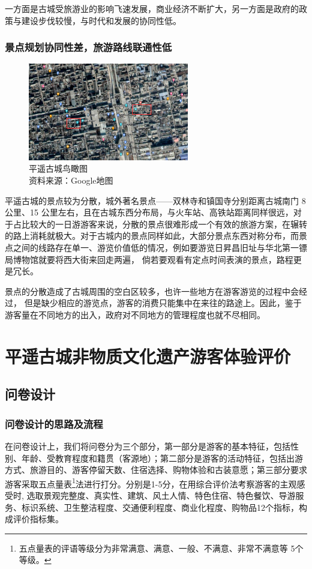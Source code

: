 \documentclass[UTF8]{ctexart}
\begin{document}
        一方面是古城受旅游业的影响飞速发展，商业经济不断扩大，另一方面是政府的政策与建设步伐较慢，与时代和发展的协同性低。
        \subsubsection{景点规划协同性差，旅游路线联通性低}
        \begin{figure}[H]
        \centering
        \includegraphics[width=7cm]{地图.png}
        \caption[plain]{平遥古城鸟瞰图\\资料来源：Google地图}

        \end{figure}
        平遥古城的景点较为分散，城外著名景点——双林寺和镇国寺分别距离古城南门 8 公里、15 公里左右，且在古城东西分布局，与火车站、高铁站距离同样很远，对于占比较大的一日游游客来说，分散的景点很难形成一个有效的旅游方案，在辗转的路上消耗就极大。对于古城内的景点同样如此，大部分景点东西对称分布，而景点之间的线路存在单一、游览价值低的情况，例如要游览日昇昌旧址与华北第一镖局博物馆就要将西大街来回走两遍， 倘若要观看有定点时间表演的景点，路程更是冗长。
        
        景点的分散造成了古城周围的空白区较多，也许一些地方在游客游览的过程中会经过， 但是缺少相应的游览点，游客的消费只能集中在来往的路途上。因此，鉴于游客量在不同地方的出入，政府对不同地方的管理程度也就不尽相同。
        
\section{平遥古城非物质文化遗产游客体验评价}
    \subsection{问卷设计}
        \subsubsection{问卷设计的思路及流程}
        在问卷设计上，我们将问卷分为三个部分，第一部分是游客的基本特征，包括性别、年龄、受教育程度和籍贯（客源地）；第二部分是游客的活动特征，包括出游方式、旅游目的、游客停留天数、住宿选择、购物体验和古装意愿；第三部分要求游客采取五点量表\footnote{五点量表的评语等级分为非常满意、满意、一般、不满意、非常不满意等 5个等级。}法进行打分。分别是1-5分，在用综合评价法考察游客的主观感受时, 选取景观完整度、真实性、建筑、风土人情、特色住宿、特色餐饮、导游服务、标识系统、卫生整洁程度、交通便利程度、商业化程度、购物品12个指标，构成评价指标集。
\end{document}
